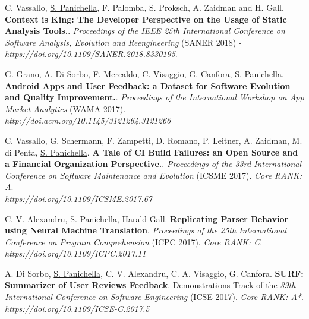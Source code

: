 \documentclass[10pt]{article}
\begin{document}
\begin{bibenum}
      \item \label{Cm2}  C. Vassallo, \underline{S. Panichella}, F. Palomba, S. Proksch, A. Zaidman and H. Gall. \textbf{Context is King: The Developer Perspective on the Usage of Static Analysis Tools.}.  \emph{Proceedings of the  {IEEE} 25th International Conference on Software Analysis, Evolution
               and Reengineering}  (SANER 2018) - \\\textit{https://doi.org/10.1109/SANER.2018.8330195}. %
      \item \label{Cm1}  G. Grano, A. Di Sorbo, F. Mercaldo, C. Visaggio, G. Canfora, \underline{S. Panichella}. \textbf{Android Apps and User Feedback: a Dataset for Software Evolution and Quality Improvement.}.  \emph{Proceedings of the  International Workshop on App Market Analytics}  (WAMA 2017). \\\textit{http://doi.acm.org/10.1145/3121264.3121266} 

      \item \label{C0}  C. Vassallo, G. Schermann, F. Zampetti, D. Romano, P. Leitner, A. Zaidman, M. di Penta, \underline{S. Panichella}.
         \textbf{A Tale of CI Build Failures: an Open Source and a Financial Organization Perspective.}.  \emph{Proceedings of the 33rd International Conference on Software Maintenance and Evolution}  (ICSME 2017). \textit{Core RANK: A}. \\\textit{https://doi.org/10.1109/ICSME.2017.67}
         
      \item \label{C1}  C. V. Alexandru, \underline{S. Panichella}, Harald Gall.
         \textbf{Replicating Parser Behavior using Neural Machine Translation}.  \emph{Proceedings of the 25th International Conference on Program Comprehension} (ICPC 2017). \textit{Core RANK: C}. \\\textit{https://doi.org/10.1109/ICPC.2017.11}
      \item \label{C2}  A. Di Sorbo,  \underline{S. Panichella}, C. V. Alexandru, C. A. Visaggio, G. Canfora.
         \textbf{SURF: Summarizer of User Reviews Feedback}.  Demonstrations Track of the  \emph{39th International Conference on Software Engineering} (ICSE 2017). \textit{Core RANK: A*}. \\\textit{https://doi.org/10.1109/ICSE-C.2017.5}


\end{bibenum}
\end{document}
